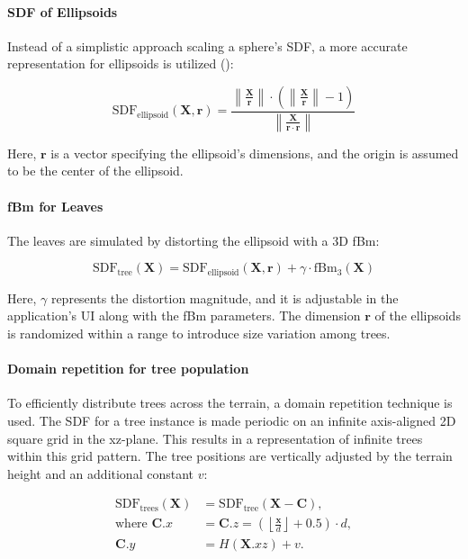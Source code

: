 \paragraph{SDF of Ellipsoids}
Instead of a simplistic approach scaling a sphere's SDF, a more accurate representation for ellipsoids is utilized ():

\begin{equation}
\text{SDF}_\text{ellipsoid}(\mathbf{X}, \mathbf{r}) = \frac{\left\|\frac{\mathbf{X}}{\mathbf{r}}\right\| \cdot \left(\left\|\frac{\mathbf{X}}{\mathbf{r}}\right\| - 1\right)}{\left\|\frac{\mathbf{X}}{\mathbf{r} \cdot \mathbf{r}}\right\|}
\end{equation}

Here, $\mathbf{r}$ is a vector specifying the ellipsoid's dimensions, and the origin is assumed to be the center of the ellipsoid.

\paragraph{fBm for Leaves}
The leaves are simulated by distorting the ellipsoid with a 3D fBm:

\begin{equation}
\text{SDF}_\text{tree}(\mathbf{X}) = \text{SDF}_\text{ellipsoid}(\mathbf{X}, \mathbf{r}) + \gamma \cdot \text{fBm}_3(\mathbf{X})
\end{equation}

Here, $\gamma$ represents the distortion magnitude, and it is adjustable in the application's UI along with the fBm parameters. The dimension $\mathbf{r}$ of the ellipsoids is randomized within a range to introduce size variation among trees.

\paragraph{Domain repetition for tree population}
To efficiently distribute trees across the terrain, a domain repetition technique is used. The SDF for a tree instance is made periodic on an infinite axis-aligned 2D square grid in the xz-plane. This results in a representation of infinite trees within this grid pattern. The tree positions are vertically adjusted by the terrain height and an additional constant $v$:

\begin{equation}
\begin{aligned}
\text{SDF}_\text{trees}(\mathbf{X}) &= \text{SDF}_\text{tree}(\mathbf{X} - \mathbf{C}), \\
\text{where } \mathbf{C}.x &= \mathbf{C}.z = \left(\left\lfloor \frac{\mathbf{x}}{d} \right\rfloor + 0.5\right) \cdot d, \\
\mathbf{C}.y &= H(\mathbf{X}.{xz}) + v.
\end{aligned}
\end{equation}

